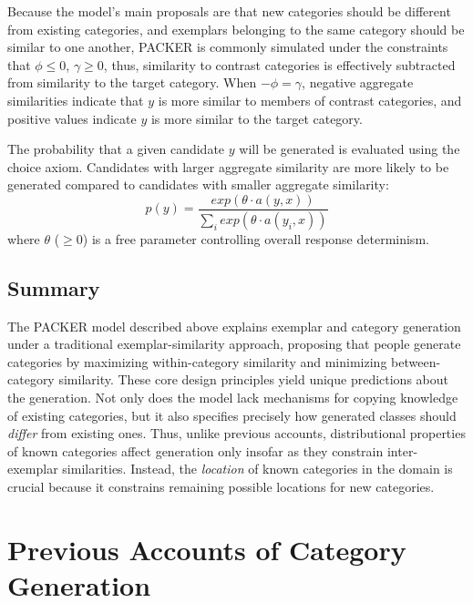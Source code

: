 \documentclass[10pt,letterpaper]{article}
\begin{document}
Because the model's main proposals are that new categories should be different from existing categories, and exemplars belonging to the same category should be similar to one another, PACKER is commonly simulated under the constraints that $\phi \leq 0$, $\gamma \geq 0$, thus, similarity to contrast categories is effectively subtracted from similarity to the target category. When $-\phi = \gamma$, negative aggregate similarities indicate that $y$ is more similar to members of contrast categories, and positive values indicate $y$ is more similar to the target category.

The probability that a given candidate $y$ will be generated is evaluated using the \citet{luce1977choice} choice axiom. Candidates with larger aggregate similarity are more likely to be generated compared to candidates with smaller aggregate similarity:
\begin{equation}
p(y) = \dfrac
    { exp( { \theta \cdot a(y, x) } ) }
    { \sum_i{ exp( { \theta \cdot a(y_i, x) } ) } }
    \label{eq:packer-choice}
\end{equation}
where $\theta$ ($\geq 0$) is a free parameter controlling overall response determinism. 

\subsection{Summary}

The PACKER model described above explains exemplar and category generation under a traditional exemplar-similarity approach, proposing that people generate categories by maximizing within-category similarity and minimizing between-category similarity. These core design principles yield unique predictions about the generation. Not only does the model lack mechanisms for copying knowledge of existing categories, but it also specifies precisely how generated classes should \textit{differ} from existing ones. Thus, unlike previous accounts, distributional properties of known categories affect generation only insofar as they constrain inter-exemplar similarities. Instead, the \textit{location} of known categories in the domain is crucial because it constrains remaining possible locations for new categories.






\section{Previous Accounts of Category Generation}
\end{document}
